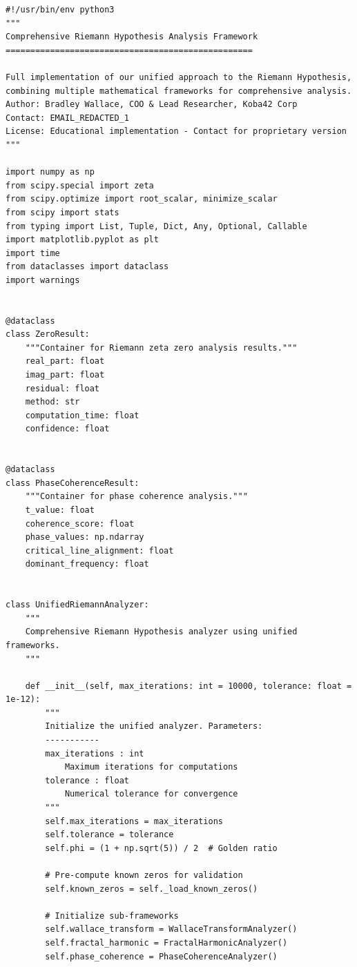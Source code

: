 \documentclass[12pt]{article}
\begin{document}
\begin{lstlisting}
#!/usr/bin/env python3
"""
Comprehensive Riemann Hypothesis Analysis Framework
==================================================

Full implementation of our unified approach to the Riemann Hypothesis,
combining multiple mathematical frameworks for comprehensive analysis. Author: Bradley Wallace, COO & Lead Researcher, Koba42 Corp
Contact: EMAIL_REDACTED_1
License: Educational implementation - Contact for proprietary version
"""

import numpy as np
from scipy.special import zeta
from scipy.optimize import root_scalar, minimize_scalar
from scipy import stats
from typing import List, Tuple, Dict, Any, Optional, Callable
import matplotlib.pyplot as plt
import time
from dataclasses import dataclass
import warnings


@dataclass
class ZeroResult:
    """Container for Riemann zeta zero analysis results."""
    real_part: float
    imag_part: float
    residual: float
    method: str
    computation_time: float
    confidence: float


@dataclass
class PhaseCoherenceResult:
    """Container for phase coherence analysis."""
    t_value: float
    coherence_score: float
    phase_values: np.ndarray
    critical_line_alignment: float
    dominant_frequency: float


class UnifiedRiemannAnalyzer:
    """
    Comprehensive Riemann Hypothesis analyzer using unified frameworks.
    """

    def __init__(self, max_iterations: int = 10000, tolerance: float = 1e-12):
        """
        Initialize the unified analyzer. Parameters:
        -----------
        max_iterations : int
            Maximum iterations for computations
        tolerance : float
            Numerical tolerance for convergence
        """
        self.max_iterations = max_iterations
        self.tolerance = tolerance
        self.phi = (1 + np.sqrt(5)) / 2  # Golden ratio

        # Pre-compute known zeros for validation
        self.known_zeros = self._load_known_zeros()

        # Initialize sub-frameworks
        self.wallace_transform = WallaceTransformAnalyzer()
        self.fractal_harmonic = FractalHarmonicAnalyzer()
        self.phase_coherence = PhaseCoherenceAnalyzer()


\end{lstlisting}
\end{document}
